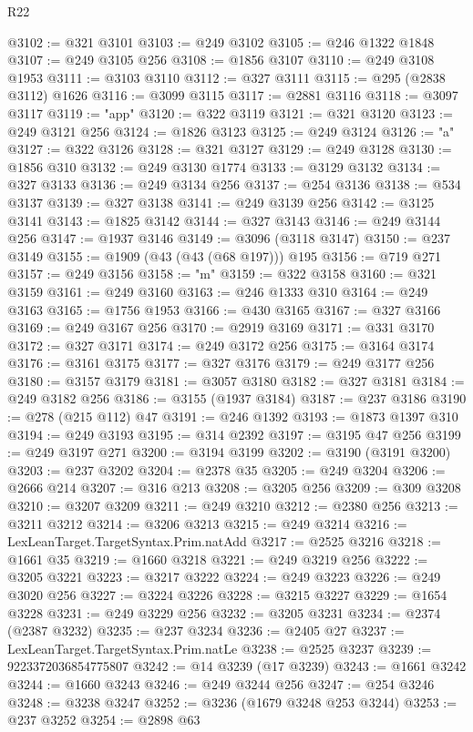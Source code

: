 \begin{lexlean}{R22}
\begin{coremodule}
@3102 := @321 @3101
@3103 := @249 @3102
@3105 := @246 @1322 @1848
@3107 := @249 @3105 @256
@3108 := @1856 @3107
@3110 := @249 @3108 @1953
@3111 := @3103 @3110
@3112 := @327 @3111
@3115 := @295 (@2838 @3112) @1626
@3116 := @3099 @3115
@3117 := @2881 @3116
@3118 := @3097 @3117
@3119 := "app"
@3120 := @322 @3119
@3121 := @321 @3120
@3123 := @249 @3121 @256
@3124 := @1826 @3123
@3125 := @249 @3124
@3126 := "a"
@3127 := @322 @3126
@3128 := @321 @3127
@3129 := @249 @3128
@3130 := @1856 @310
@3132 := @249 @3130 @1774
@3133 := @3129 @3132
@3134 := @327 @3133
@3136 := @249 @3134 @256
@3137 := @254 @3136
@3138 := @534 @3137
@3139 := @327 @3138
@3141 := @249 @3139 @256
@3142 := @3125 @3141
@3143 := @1825 @3142
@3144 := @327 @3143
@3146 := @249 @3144 @256
@3147 := @1937 @3146
@3149 := @3096 (@3118 @3147)
@3150 := @237 @3149
@3155 := @1909 (@43 (@43 (@68 @197))) @195
@3156 := @719 @271
@3157 := @249 @3156
@3158 := "m"
@3159 := @322 @3158
@3160 := @321 @3159
@3161 := @249 @3160
@3163 := @246 @1333 @310
@3164 := @249 @3163
@3165 := @1756 @1953
@3166 := @430 @3165
@3167 := @327 @3166
@3169 := @249 @3167 @256
@3170 := @2919 @3169
@3171 := @331 @3170
@3172 := @327 @3171
@3174 := @249 @3172 @256
@3175 := @3164 @3174
@3176 := @3161 @3175
@3177 := @327 @3176
@3179 := @249 @3177 @256
@3180 := @3157 @3179
@3181 := @3057 @3180
@3182 := @327 @3181
@3184 := @249 @3182 @256
@3186 := @3155 (@1937 @3184)
@3187 := @237 @3186
@3190 := @278 (@215 @112) @47
@3191 := @246 @1392
@3193 := @1873 @1397 @310
@3194 := @249 @3193
@3195 := @314 @2392
@3197 := @3195 @47 @256
@3199 := @249 @3197 @271
@3200 := @3194 @3199
@3202 := @3190 (@3191 @3200)
@3203 := @237 @3202
@3204 := @2378 @35
@3205 := @249 @3204
@3206 := @2666 @214
@3207 := @316 @213
@3208 := @3205 @256
@3209 := @309 @3208
@3210 := @3207 @3209
@3211 := @249 @3210
@3212 := @2380 @256
@3213 := @3211 @3212
@3214 := @3206 @3213
@3215 := @249 @3214
@3216 := LexLeanTarget.TargetSyntax.Prim.natAdd
@3217 := @2525 @3216
@3218 := @1661 @35
@3219 := @1660 @3218
@3221 := @249 @3219 @256
@3222 := @3205 @3221
@3223 := @3217 @3222
@3224 := @249 @3223
@3226 := @249 @3020 @256
@3227 := @3224 @3226
@3228 := @3215 @3227
@3229 := @1654 @3228
@3231 := @249 @3229 @256
@3232 := @3205 @3231
@3234 := @2374 (@2387 @3232)
@3235 := @237 @3234
@3236 := @2405 @27
@3237 := LexLeanTarget.TargetSyntax.Prim.natLe
@3238 := @2525 @3237
@3239 := 9223372036854775807
@3242 := @14 @3239 (@17 @3239)
@3243 := @1661 @3242
@3244 := @1660 @3243
@3246 := @249 @3244 @256
@3247 := @254 @3246
@3248 := @3238 @3247
@3252 := @3236 (@1679 @3248 @253 @3244)
@3253 := @237 @3252
@3254 := @2898 @63

\end{coremodule}
\end{lexlean}
